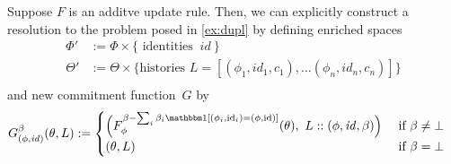\documentclass{article}
\def\cofunc{commitment function}
\begin{document}
\section{}
\begin{example}\label{ex:dupl-enriched}
Suppose $F$ is an additve update rule. Then, we can explicitly construct a resolution to the problem posed in \cref{ex:dupl} by defining enriched spaces
\begin{align*}
    \Phi' &:= \Phi \times \Big\{ \text{ identities }~ \mathit{id}~ \Big\}\\
    \Theta' &:= \Theta \times 
        \Big\{ \text{histories } L = [(\phi_1, \mathit{id}_1, c_1), \ldots (\phi_n, \mathit{id}_n, c_n)] \Big\} \\
\end{align*}
and new \cofunc\ $G$ by 
\begin{align*}
     G^{\beta}_{(\phi,\mathit{id})}(\theta, L) & := 
        \begin{cases}
        \Big( F^{\beta- \sum_{i}\beta_i \mathbbm1[(\phi_i,\mathrm{id}_i) = (\phi, \mathrm{id})]}_{\phi}(\theta),~
             L :: (\phi,\mathit{id}, \beta) 
         \Big)
             &\text{ if } \beta \ne \bot \\
        (\theta, L) & 
               \text{ if } \beta = \bot
    \end{cases} 
\end{align*} 
\end{example}
\end{document}
